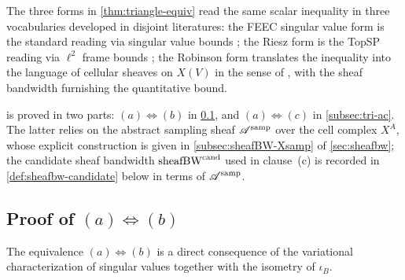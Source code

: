 \begin{remark}\label{rem:three-readings}
The three forms in \cref{thm:triangle-equiv} read the same scalar
inequality in three vocabularies developed in disjoint literatures:
the FEEC singular value form is the standard reading via singular
value bounds \cite{AFW2010}; the Riesz form is the TopSP reading via
$\ell^2$ frame bounds \cite{BarbarossaSardellitti2020}; the Robinson
form translates the inequality into the language of cellular sheaves
on $X(V)$ in the sense of \cite{Robinson2014}, with the sheaf
bandwidth furnishing the quantitative bound.
\end{remark}

 is proved in two parts:
$(a) \Leftrightarrow (b)$ in \cref{subsec:tri-ab}, and
$(a) \Leftrightarrow (c)$ in \cref{subsec:tri-ac}. The latter relies
on the abstract sampling sheaf $\mathscr{A}^{\mathrm{samp}}$ over the cell complex $X^A$,
whose explicit construction is given in
\cref{subsec:sheafBW-Xsamp} of \cref{sec:sheafbw}; the candidate
sheaf bandwidth $\operatorname{sheafBW}^{\mathrm{cand}}$ used in clause~\textup{(c)}
is recorded in \cref{def:sheafbw-candidate} below in terms of
$\mathscr{A}^{\mathrm{samp}}$.

\subsection{Proof of $(a) \Leftrightarrow (b)$}\label{subsec:tri-ab}

The equivalence $(a) \Leftrightarrow (b)$ is a direct consequence of
the variational characterization of singular values together with the
isometry of $\iota_B$.

